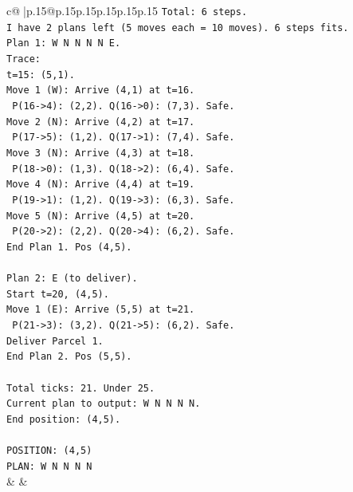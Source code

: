 \documentclass{article}
\begin{document}
{\begin{supertabular}{c@{$\;$}|p{.15\linewidth}@{}p{.15\linewidth}p{.15\linewidth}p{.15\linewidth}p{.15\linewidth}p{.15\linewidth}}
{{{\texttt{Total: 6 steps.} \\
\texttt{I have 2 plans left (5 moves each = 10 moves). 6 steps fits.} \\
\texttt{Plan 1: W N N N N E.} \\
\texttt{Trace:} \\
\texttt{t=15: (5,1).} \\
\texttt{Move 1 (W): Arrive (4,1) at t=16.} \\
\texttt{  P(16{-}>4): (2,2). Q(16{-}>0): (7,3). Safe.} \\
\texttt{Move 2 (N): Arrive (4,2) at t=17.} \\
\texttt{  P(17{-}>5): (1,2). Q(17{-}>1): (7,4). Safe.} \\
\texttt{Move 3 (N): Arrive (4,3) at t=18.} \\
\texttt{  P(18{-}>0): (1,3). Q(18{-}>2): (6,4). Safe.} \\
\texttt{Move 4 (N): Arrive (4,4) at t=19.} \\
\texttt{  P(19{-}>1): (1,2). Q(19{-}>3): (6,3). Safe.} \\
\texttt{Move 5 (N): Arrive (4,5) at t=20.} \\
\texttt{  P(20{-}>2): (2,2). Q(20{-}>4): (6,2). Safe.} \\
\texttt{End Plan 1. Pos (4,5).} \\
\\ 
\texttt{Plan 2: E (to deliver).} \\
\texttt{Start t=20, (4,5).} \\
\texttt{Move 1 (E): Arrive (5,5) at t=21.} \\
\texttt{  P(21{-}>3): (3,2). Q(21{-}>5): (6,2). Safe.} \\
\texttt{Deliver Parcel 1.} \\
\texttt{End Plan 2. Pos (5,5).} \\
\\ 
\texttt{Total ticks: 21. Under 25.} \\
\texttt{Current plan to output: W N N N N.} \\
\texttt{End position: (4,5).} \\
\\ 
\texttt{POSITION: (4,5)} \\
\texttt{PLAN: W N N N N} \\
            }
        }
    }
    & & \\ \\


\end{supertabular}}
\end{document}
